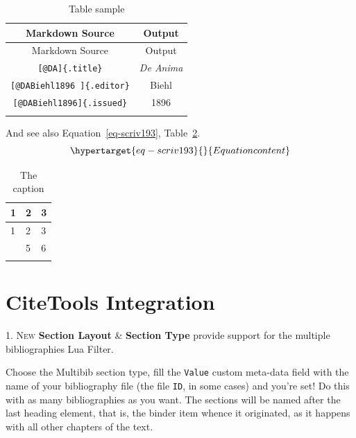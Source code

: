 \documentclass[
  12pt,
  a4paper,
  oneside,
  titlepage,
  toclink=all,
  toc=bibliography]{scrbook}
\theoremstyle{plain}
\theoremstyle{definition}
\theoremstyle{definition}
\theoremstyle{plain}
\theoremstyle{plain}
\theoremstyle{plain}
\theoremstyle{definition}
\theoremstyle{plain}
\theoremstyle{remark}
\begin{document}
\hypertarget{tbl-scriv192}{}
\begin{longtable}[]{@{}cc@{}}
\toprule\noalign{}
Markdown Source & Output \\
\midrule\noalign{}
\endfirsthead
\toprule\noalign{}
Markdown Source & Output \\
\midrule\noalign{}
\endhead
\bottomrule\noalign{}
\endlastfoot
\texttt{{[}@DA{]}\{.title\}} & \emph{De Anima} \\
\texttt{{[}@DABiehl1896\ {]}\{.editor\}} & Biehl \\
\texttt{{[}@DABiehl1896{]}\{.issued\}} & 1896 \\
\caption{\label{tbl-scriv192}Table sample}\tabularnewline
\end{longtable}

And see also
\protect\hypertarget{cite_59}{}{\label{cite_59}Equation~\ref{eq-scriv193}},
\protect\hypertarget{cite_60}{}{\label{cite_60}Table~\ref{tbl-scriv194}}.\\
\begin{equation}\protect\hypertarget{eq-scriv193}{}{Equation content
}\label{eq-scriv193}\end{equation}

\hypertarget{tbl-scriv194}{}
\begin{longtable}[]{@{}lll@{}}
\toprule\noalign{}
1 & 2 & 3 \\
\midrule\noalign{}
\endfirsthead
\toprule\noalign{}
1 & 2 & 3 \\
\midrule\noalign{}
\endhead
\bottomrule\noalign{}
\endlastfoot
4 & 5 & 6 \\
\caption{\label{tbl-scriv194}The caption}\tabularnewline
\end{longtable}

\hypertarget{sec-scriv195}{%
\section{CiteTools Integration}\label{sec-scriv195}}

\protect\hypertarget{scriv195}{}{}

\protect\hypertarget{scriv196}{}{} \textsc{1. New} \textbf{Section
Layout} \& \textbf{Section Type} provide support for the multiple
bibliographies Lua Filter.

Choose the Multibib section type, fill the \texttt{Value} custom
meta-data field with the name of your bibliography file (the file
\texttt{ID}, in some cases) and you're set! Do this with as many
bibliographies as you want. The sections will be named after the last
heading element, that is, the binder item whence it originated, as it
happens with all other chapters of the text.
\end{document}
